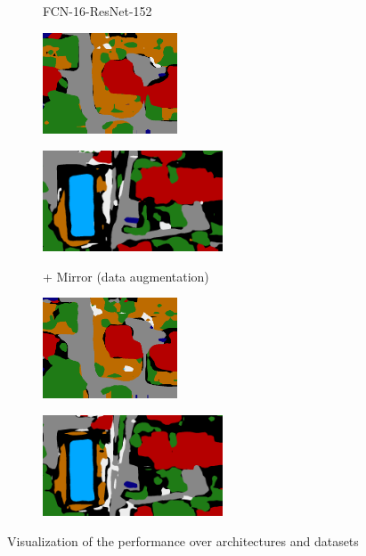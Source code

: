 \begin{figure}[ht!]
  \begin{subfigure}[c]{0.20\textwidth}
    \centering FCN-16-ResNet-152
  \end{subfigure}
  \begin{subfigure}[c]{0.33\textwidth}
    \includegraphics[height=3cm]{images/part4/swi_152s.png}
  \end{subfigure}
  \begin{subfigure}[c]{0.45\textwidth}
    \includegraphics[height=3cm]{images/part4/oku_152s.png}
  \end{subfigure}
  \vspace{0.1cm}
  
  \begin{subfigure}[c]{0.20\textwidth}
    \centering + Mirror (data augmentation)
  \end{subfigure}
  \begin{subfigure}[c]{0.33\textwidth}
    \includegraphics[height=3cm]{images/part4/swi_mirror.png}
  \end{subfigure}
  \begin{subfigure}[c]{0.45\textwidth}
    \includegraphics[height=3cm]{images/part4/oku_mirror.png}
  \end{subfigure}
  \vspace{0.1cm}
  
  \caption{Visualization of the performance over architectures and datasets}
\end{figure}
\label{fig:part4:visu_archi}

